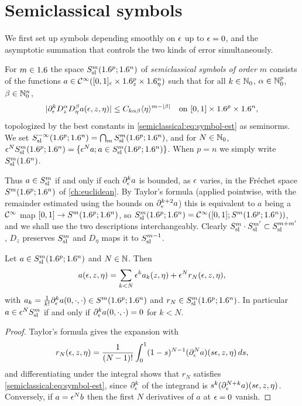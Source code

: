 \section{Semiclassical symbols}\label{semiclassical:sec:symbols}
We first set up symbols depending smoothly on $\epsilon$ up to $\epsilon=0$, and the
asymptotic summation that controls the two kinds of error simultaneously.

\begin{definition}\label{semiclassical:def:symbols}
  For $m\in1.6$ the space $S^{m}_{\mathrm{sl}}(1.6^p;1.6^n)$ of \emph{semiclassical symbols of
  order $m$} consists of the functions $a\in\mathcal{C}^\infty([0,1]_\epsilon\times1.6^p_z\times1.6^n_\eta)$
  such that for all $k\in\mathbb{N}_0$, $\alpha\in\mathbb{N}_0^p$, $\beta\in\mathbb{N}_0^n$,
  \begin{equation}\label{semiclassical:eq:symbol-est}
    \lvert \partial_\epsilon^kD^\alpha_zD^\beta_\eta a(\epsilon,z,\eta)\rvert\le C_{k\alpha\beta}\langle \eta\rangle^{m-\lvert \beta\rvert}
    \quad\text{on }[0,1]\times1.6^p\times1.6^n,
  \end{equation}
  topologized by the best constants in \eqref{semiclassical:eq:symbol-est} as
  seminorms. We set $S^{-\infty}_{\mathrm{sl}}(1.6^p;1.6^n)=\bigcap_mS^{m}_{\mathrm{sl}}(1.6^p;1.6^n)$, and
  for $N\in\mathbb{N}_0$, $\epsilon^NS^{m}_{\mathrm{sl}}(1.6^p;1.6^n)=\{\epsilon^Na;a\in S^{m}_{\mathrm{sl}}(1.6^p;1.6^n)\}$.
  When $p=n$ we simply write $S^{m}_{\mathrm{sl}}(1.6^n)$.
\end{definition}

Thus $a\in S^{m}_{\mathrm{sl}}$ if and only if each $\partial_\epsilon^ka$ is bounded, as $\epsilon$
varies, in the Fr\'echet space $S^m(1.6^p;1.6^n)$ of \cref{ch:euclidean}. By
Taylor's formula (applied pointwise, with the remainder estimated using the
bounds on $\partial^{k+2}_\epsilon a$) this is equivalent to $a$ being a $\mathcal{C}^\infty$ map
$[0,1]\to S^m(1.6^p;1.6^n)$, so $S^{m}_{\mathrm{sl}}(1.6^p;1.6^n)=\mathcal{C}^\infty([0,1];S^m(1.6^p;1.6^n))$,
and we shall use the two descriptions interchangeably. Clearly
$S^{m}_{\mathrm{sl}}\cdot S^{m'}_{\mathrm{sl}}\subset S^{m+m'}_{\mathrm{sl}}$, $D_z$ preserves $S^{m}_{\mathrm{sl}}$ and $D_\eta$
maps it to $S^{m-1}_{\mathrm{sl}}$.

\begin{lemma}\label{semiclassical:lem:taylor}
  Let $a\in S^{m}_{\mathrm{sl}}(1.6^p;1.6^n)$ and $N\in\mathbb{N}$. Then
  \begin{equation*}
    a(\epsilon,z,\eta)=\sum_{k<N}\epsilon^ka_k(z,\eta)+\epsilon^Nr_N(\epsilon,z,\eta),
  \end{equation*}
  with $a_k=\frac1{k!}\partial_\epsilon^ka(0,\cdot,\cdot)\in S^m(1.6^p;1.6^n)$ and $r_N\in S^{m}_{\mathrm{sl}}(1.6^p;1.6^n)$.
  In particular $a\in\epsilon^NS^{m}_{\mathrm{sl}}$ if and only if $\partial^k_\epsilon a(0,\cdot,\cdot)=0$
  for $k<N$.
\end{lemma}
\begin{proof}
  Taylor's formula gives the expansion with
  \begin{equation*}
    r_N(\epsilon,z,\eta)=\frac1{(N-1)!}\int_0^1(1-s)^{N-1}(\partial_\epsilon^Na)(s\epsilon,z,\eta)\,ds,
  \end{equation*}
  and differentiating under the integral shows that $r_N$ satisfies
  \eqref{semiclassical:eq:symbol-est}, since $\partial_\epsilon^k$ of the integrand is
  $s^k(\partial_\epsilon^{N+k}a)(s\epsilon,z,\eta)$. Conversely, if $a=\epsilon^Nb$ then the first
  $N$ derivatives of $a$ at $\epsilon=0$ vanish.
\end{proof}

